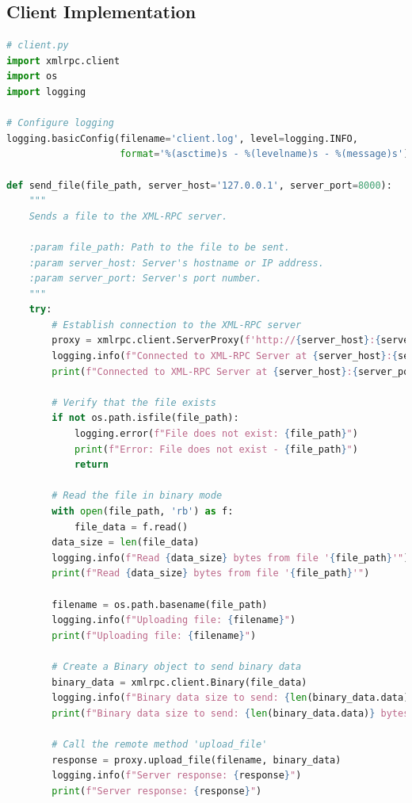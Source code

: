 \documentclass[12pt]{article}
\begin{document}
\subsection{Client Implementation}

\begin{lstlisting}[language=Python, caption={Client-side Implementation}, label={lst:client_code}]
# client.py
import xmlrpc.client
import os
import logging

# Configure logging
logging.basicConfig(filename='client.log', level=logging.INFO,
                    format='%(asctime)s - %(levelname)s - %(message)s')

def send_file(file_path, server_host='127.0.0.1', server_port=8000):
    """
    Sends a file to the XML-RPC server.

    :param file_path: Path to the file to be sent.
    :param server_host: Server's hostname or IP address.
    :param server_port: Server's port number.
    """
    try:
        # Establish connection to the XML-RPC server
        proxy = xmlrpc.client.ServerProxy(f'http://{server_host}:{server_port}/RPC2')
        logging.info(f"Connected to XML-RPC Server at {server_host}:{server_port}")
        print(f"Connected to XML-RPC Server at {server_host}:{server_port}")

        # Verify that the file exists
        if not os.path.isfile(file_path):
            logging.error(f"File does not exist: {file_path}")
            print(f"Error: File does not exist - {file_path}")
            return

        # Read the file in binary mode
        with open(file_path, 'rb') as f:
            file_data = f.read()
        data_size = len(file_data)
        logging.info(f"Read {data_size} bytes from file '{file_path}'")
        print(f"Read {data_size} bytes from file '{file_path}'")

        filename = os.path.basename(file_path)
        logging.info(f"Uploading file: {filename}")
        print(f"Uploading file: {filename}")

        # Create a Binary object to send binary data
        binary_data = xmlrpc.client.Binary(file_data)
        logging.info(f"Binary data size to send: {len(binary_data.data)} bytes")
        print(f"Binary data size to send: {len(binary_data.data)} bytes")

        # Call the remote method 'upload_file'
        response = proxy.upload_file(filename, binary_data)
        logging.info(f"Server response: {response}")
        print(f"Server response: {response}")


\end{lstlisting}
\end{document}
